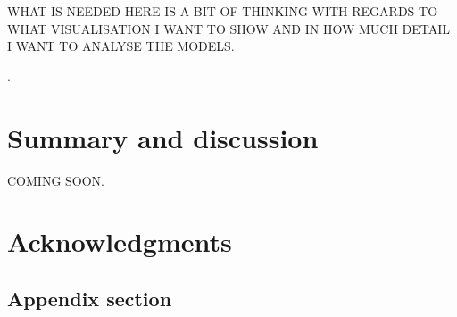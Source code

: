 \documentclass[article]{jss}
\begin{document}
WHAT IS NEEDED HERE IS A BIT OF THINKING WITH REGARDS TO WHAT VISUALISATION I WANT TO SHOW AND IN HOW MUCH DETAIL I WANT TO ANALYSE THE MODELS. 


\begin{CodeInput}
.
\end{CodeInput}







\section{Summary and discussion} \label{sec:summary}

COMING SOON. 




\section*{Acknowledgments}









\newpage

\begin{appendix}

\section{Appendix section} \label{app:technical}

\end{appendix}

\end{document}
